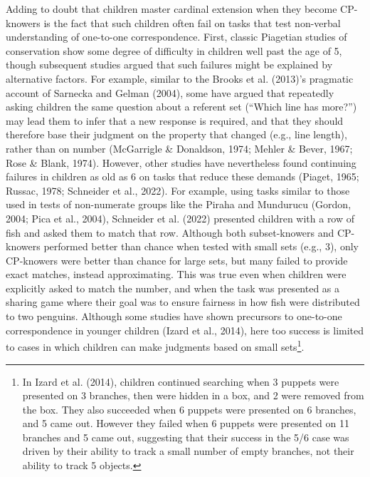 \documentclass[
  man,floatsintext]{apa7}
\begin{document}
Adding to doubt that children master cardinal extension when they become CP-knowers is the fact that such children often fail on tasks that test non-verbal understanding of one-to-one correspondence. First, classic Piagetian studies of conservation show some degree of difficulty in children well past the age of 5, though subsequent studies argued that such failures might be explained by alternative factors. For example, similar to the Brooks et al. (2013)'s pragmatic account of Sarnecka and Gelman (2004), some have argued that repeatedly asking children the same question about a referent set (``Which line has more?'') may lead them to infer that a new response is required, and that they should therefore base their judgment on the property that changed (e.g., line length), rather than on number (McGarrigle \& Donaldson, 1974; Mehler \& Bever, 1967; Rose \& Blank, 1974). However, other studies have nevertheless found continuing failures in children as old as 6 on tasks that reduce these demands (Piaget, 1965; Russac, 1978; Schneider et al., 2022). For example, using tasks similar to those used in tests of non-numerate groups like the Piraha and Mundurucu (Gordon, 2004; Pica et al., 2004), Schneider et al. (2022) presented children with a row of fish and asked them to match that row. Although both subset-knowers and CP-knowers performed better than chance when tested with small sets (e.g., 3), only CP-knowers were better than chance for large sets, but many failed to provide exact matches, instead approximating. This was true even when children were explicitly asked to match the number, and when the task was presented as a sharing game where their goal was to ensure fairness in how fish were distributed to two penguins. Although some studies have shown precursors to one-to-one correspondence in younger children (Izard et al., 2014), here too success is limited to cases in which children can make judgments based on small sets\footnote{In Izard et al. (2014), children continued searching when 3 puppets were presented on 3 branches, then were hidden in a box, and 2 were removed from the box. They also succeeded when 6 puppets were presented on 6 branches, and 5 came out. However they failed when 6 puppets were presented on 11 branches and 5 came out, suggesting that their success in the 5/6 case was driven by their ability to track a small number of empty branches, not their ability to track 5 objects.}.
\end{document}
